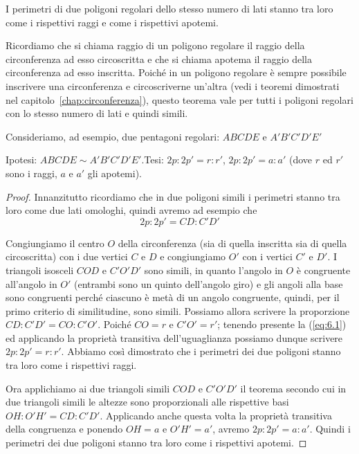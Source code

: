 \begin{teorema}
I perimetri di due poligoni regolari dello stesso numero di lati stanno tra loro come i rispettivi raggi e come i rispettivi apotemi.
\end{teorema}

Ricordiamo che si chiama raggio di un poligono regolare il raggio della circonferenza ad esso circoscritta e che si chiama apotema il raggio della circonferenza ad esso inscritta. Poiché in un poligono regolare è sempre possibile inscrivere una circonferenza e circoscriverne un'altra (vedi i teoremi dimostrati nel capitolo~\ref{chap:circonferenza}), questo teorema vale per tutti i poligoni regolari con lo stesso numero di lati e quindi simili.

Consideriamo, ad esempio, due pentagoni regolari: $ABCDE$ e $A'B'C'D'E'$

\noindent Ipotesi: $ABCDE\sim A'B'C'D'E'$.\tab Tesi: $2p : 2p' = r : r'$, $2p : 2p' = a : a'$ (dove $r$ ed $r'$ sono i raggi, $a$ e $a'$ gli apotemi).

\begin{proof}
Innanzitutto ricordiamo che in due poligoni simili i perimetri stanno tra loro come due lati omologhi, quindi avremo ad esempio che
\begin{equation}\label{eq:6.1}
2p : 2p' = CD : C'D'
\end{equation}

Congiungiamo il centro $O$ della circonferenza (sia di quella inscritta sia di quella circoscritta) con i due vertici $C$ e $D$ e congiungiamo $O'$ con i vertici $C'$ e $D'$. I triangoli isosceli $COD$ e $C'O'D'$ sono simili, in quanto l'angolo in $O$ è congruente all'angolo in $O'$ (entrambi sono un quinto dell'angolo giro) e gli angoli alla base sono congruenti perché ciascuno è metà di un angolo congruente, quindi, per il primo criterio di similitudine, sono simili. Possiamo allora scrivere la proporzione $CD : C'D' = CO : C'O'$.
Poiché $CO = r$ e $C'O' = r'$; tenendo presente la (\ref{eq:6.1}) ed applicando la proprietà transitiva dell'uguaglianza possiamo dunque scrivere $2p : 2p' = r : r'$. Abbiamo così dimostrato che i perimetri dei due poligoni stanno tra loro come i rispettivi raggi.

Ora applichiamo ai due triangoli simili $COD$ e $C'O'D'$ il teorema secondo cui in due triangoli simili le altezze sono proporzionali alle rispettive basi $OH : O'H' = CD : C'D'$. Applicando anche questa volta la proprietà transitiva della congruenza e ponendo $OH = a$ e $O'H' =a'$, avremo $2p : 2p' = a : a'$.
Quindi i perimetri dei due poligoni stanno tra loro come i rispettivi apotemi.
\end{proof}

